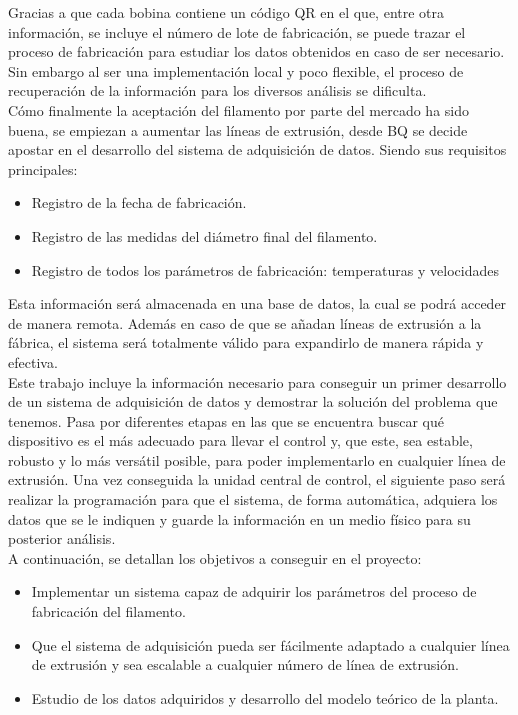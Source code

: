 Gracias a que cada bobina contiene un código QR en el que, entre otra información, se incluye el número de lote de fabricación, se puede trazar el proceso de fabricación para estudiar los datos obtenidos en caso de ser necesario. Sin embargo al ser una implementación local y poco flexible, el proceso de recuperación de la información para los diversos análisis se dificulta.\\

Cómo finalmente la aceptación del filamento por parte del mercado ha sido buena, se empiezan a aumentar las líneas de extrusión, desde BQ se decide apostar en el desarrollo del sistema de adquisición de datos. Siendo sus requisitos principales:

\begin{itemize}
    \item{Registro de la fecha de fabricación.}
    \item{Registro de las medidas del diámetro final del filamento.}
    \item{Registro de todos los parámetros de fabricación: temperaturas y velocidades}
\end{itemize}

Esta información será almacenada en una base de datos, la cual se podrá acceder de manera remota. Además en caso de que se añadan líneas de extrusión a la fábrica, el sistema será totalmente válido para expandirlo de manera rápida y efectiva.\\

Este trabajo incluye la información necesario para conseguir un primer desarrollo de un sistema de adquisición de datos y demostrar la solución del problema que tenemos. Pasa por diferentes etapas en las que se encuentra buscar qué dispositivo es el más adecuado para llevar el control y, que este, sea estable, robusto y lo más versátil posible, para poder implementarlo en cualquier línea de extrusión. Una vez conseguida la unidad central de control, el siguiente paso será realizar la programación para que el sistema, de forma automática, adquiera los datos que se le indiquen y guarde la información en un medio físico para su posterior análisis.\\

A continuación, se detallan los objetivos a conseguir en el proyecto:

\begin{itemize}
    \item Implementar un sistema capaz de adquirir los parámetros del proceso de fabricación del filamento.
    \item Que el sistema de adquisición pueda ser fácilmente adaptado a cualquier línea de extrusión y sea escalable a cualquier número de línea de extrusión.
    \item Estudio de los datos adquiridos y desarrollo del modelo teórico de la planta.
\end{itemize}
\label{Listado_objetivos}

